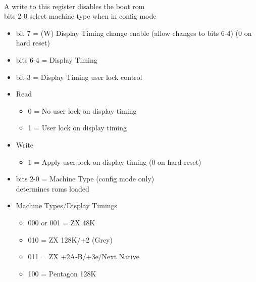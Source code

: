 \\
A write to this register disables the boot rom\\
bits 2-0 select machine type when in config mode
\begin{itemize}
\item bit 7 = (W) Display Timing change enable (allow changes to
  bits 6-4) (0 on hard reset)
\item bits 6-4 = Display Timing
\item bit 3 = Display Timing user lock control
  \item[] Read
  \begin{itemize}
  \item 0 = No user lock on display timing
  \item 1 = User lock on display timing
  \end{itemize}
  \item[] Write
  \begin{itemize}
  \item 1 = Apply user lock on display timing (0 on hard reset)
  \end{itemize}
\item bits 2-0 = Machine Type (config mode only)\\
determines roms loaded
\item[] Machine Types/Display Timings
  \begin{itemize}
  \item 000 or 001 = ZX 48K
  \item 010 = ZX 128K/+2 (Grey)
  \item 011 = ZX +2A-B/+3e/Next Native
  \item 100 = Pentagon 128K
  \end{itemize}
\end{itemize}

